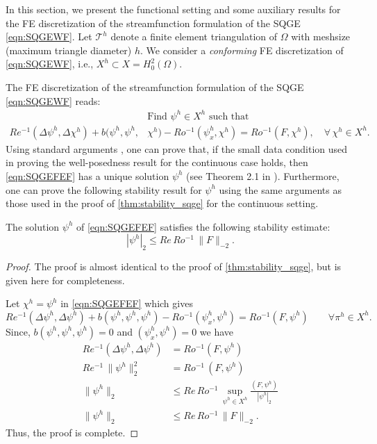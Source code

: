 In this section, we present the functional setting and some auxiliary results
for the FE discretization of the streamfunction formulation of the SQGE
\eqref{eqn:SQGEWF}. Let $\mathcal{T}^h$ denote a finite element triangulation of
$\Omega$ with meshsize (maximum triangle diameter) $h$. We consider a
\emph{conforming} FE discretization of \eqref{eqn:SQGEWF}, i.e., $X^h \subset X
= H_0^2(\Omega)$.

The FE discretization of the streamfunction formulation of the SQGE
\eqref{eqn:SQGEWF} reads:
\begin{equation}
  \begin{split}
    &\text{Find } \psi^h \in X^h \text{ such that} \\
    Re^{-1}(\Delta \psi^h, \Delta \chi^h)
      + b(\psi^h,\psi^h,&\chi^h)
      - Ro^{-1} (\psi_x^h,\chi^h)
      = Ro^{-1}(F,\chi^h),\quad \forall \, \chi^h \in X^h.
    \label{eqn:SQGEFEF}
  \end{split}
\end{equation}
Using standard arguments \cite{Girault79,Girault86}, one can prove that, if the
small data condition used in proving the well-posedness result for the
continuous case holds, then \eqref{eqn:SQGEFEF} has a unique solution $\psi^h$
(see Theorem 2.1 in \cite{Cayco86}). Furthermore, one can prove the following
stability result for $\psi^h$ using the same arguments as those used in the
proof of \eqref{thm:stability_sqge} for the continuous setting.
\begin{thm} \label{thm:stability_fem_sqge} The
  solution $\psi^h$ of \eqref{eqn:SQGEFEF} satisfies the following stability estimate:
 \begin{equation}
   |\psi^h|_2 \le Re \, Ro^{-1} \, \| F \|_{-2} .
   \label{eqn:stability_fem_sqge}
 \end{equation}
\end{thm}
\begin{proof}
  The proof is almost identical to the proof of \autoref{thm:stability_sqge},
  but is given here for completeness.

  Let $\chi^h = \psi^h$ in \eqref{eqn:SQGEFEF} which gives
  \begin{equation*}
    Re^{-1}(\Delta \psi^h, \Delta \psi^h)
      + b(\psi^h,\psi^h,\psi^h)
      - Ro^{-1} (\psi_x^h,\psi^h)
      = Ro^{-1} (F,\psi^h)\qquad  \forall \pi^h \in X^h.
  \end{equation*}
  Since, $b(\psi^h, \psi^h, \psi^h) =0$ and $(\psi_x^h,\psi^h)=0$ we have
  \begin{align*}
    Re^{-1}(\Delta \psi^h, \Delta \psi^h) &= Ro^{-1} (F,\psi^h) \\
    Re^{-1}\, \|\psi^h\|_2^2 &= Ro^{-1}\, (F,\psi^h) \\
    \|\psi^h\|_2 &\le Re\, Ro^{-1}\,\sup_{\psi^h \in X^h} \frac{(F,\psi^h)}{|\psi^h|_2} \\
    \|\psi^h\|_2 &\le Re\, Ro^{-1}\, \|F\|_{-2}.
  \end{align*}
  Thus, the proof is complete.
\end{proof}

